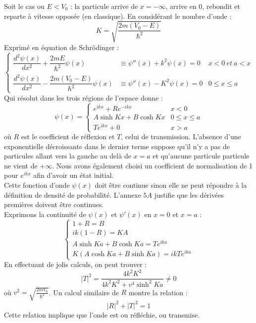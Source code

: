 \documentclass[british,french,11pt, a4paper, openany]{book}
\begin{document}
	Soit le cas ou $E < V_0$ : la particule arrive de $x = -\infty$, arrive en 0, rebondit et reparte à vitesse opposée (en classique). En considérant le nombre d'onde :
	\begin{equation}
		K = \sqrt{\frac{2m(V_0 - E)}{\hbar^2}}
	\end{equation}
	Exprimé en équation de Schrödinger :
	\begin{equation}
		\left\{\begin{array}{lll}
			\dfrac{d^2\psi(x)}{dx^2} + \dfrac{2mE}{\hbar^2}\psi(x)  & \equiv \psi''(x) + k^2\psi(x) = 0 & x<0\ et\ a < x\\
			\dfrac{d^2\psi(x)}{dx^2} - \dfrac{2m(V_0-E)}{\hbar^2}\psi(x)  & \equiv \psi''(x) -K^2\psi(x) = 0 & 0 \leq x \leq a
		\end{array}\right.
	\end{equation}
	Qui résolut dans les trois régions de l'espace donne : 
	\begin{equation}
		\psi(x) = \left\{\begin{array}{ll}
			e^{ikx} + Re^{-ikx} & x<0\\
			A\sinh Kx + B\cosh Kx & 0\leq x \leq a\\
			Te^{ikx} + 0 & x > a
		\end{array}\right.
	\end{equation}
	où $R$ est le coefficient de réflexion et $T$, celui de transmission. L'absence d'une exponentielle décroissante dans le dernier terme suppose qu'il n'y a pas de particules allant vers la gauche au delà de $x=a$ et qu'aucune particule particule ne vient de $+\infty$. Nous avons également choisi un coefficient de normalisation de 1 pour $e^{ikx}$ afin d'avoir un état initial.\\
	
	Cette fonction d'onde $\psi(x)$ doit être continue sinon elle ne peut répondre à la définition de densité de probabilité. L'annexe $5A$ justifie que les dérivées premières doivent être continues.\\
	Exprimons la continuité de $\psi(x)$ et $\psi'(x)$ en $x=0$ et $x=a$ :
	\begin{equation}
		\left\{\begin{array}{l}
			1+R = B\\
			ik(1-R) = KA\\
			A\sinh Ka + B\cosh Ka = Te^{ika}\\
			K(A\cosh Ka + B\sinh Ka) = ikTe^{ika}
		\end{array}\right.
	\end{equation}
	En effectuant de jolis calculs, on peut trouver :
	\begin{equation}
		|T|^2 = \dfrac{4k^2K^2}{4k^2K^2 + v^4\sinh^2 Ka} \neq 0
	\end{equation}
	où $v^2 = \sqrt{\frac{2mV_0}{\hbar^2}}$. Un calcul similaire de $R$ montre la relation :
	\begin{equation}
		|R|^2 + |T|^2 = 1
	\end{equation}
	Cette relation implique que l'onde est ou réfléchie, ou transmise.\\
	
\end{document}
